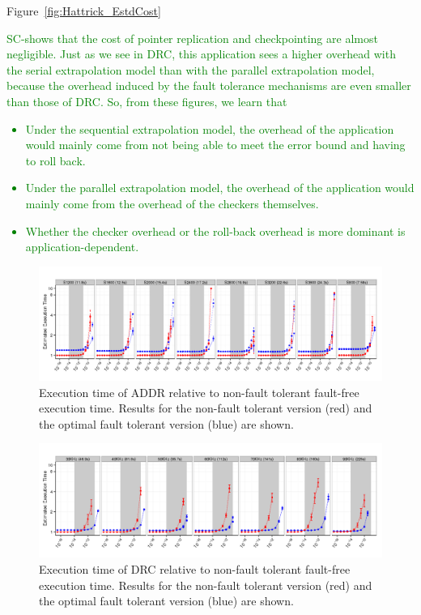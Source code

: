 \documentclass{sig-alternate}
\newcommand{\sui}[1]{%
  \textcolor{green}{SC-#1}
}
\begin{document}
{Figure~\ref{fig:Hattrick_EstdCost}
\sui{shows that the cost of pointer replication and checkpointing are almost negligible. Just as we see in DRC, this application sees a higher overhead with the serial extrapolation model than with the parallel extrapolation model, because the overhead induced by the fault tolerance mechanisms are
even smaller than those of DRC.
So, from these figures, we learn that
\begin{itemize}
\item{Under the sequential extrapolation model, the overhead of the application would mainly come from not being able to meet the error bound and having to roll back.}
\item{Under the parallel extrapolation model, the overhead of the application would mainly come from the overhead of the checkers themselves.}
\item{Whether the checker overhead or the roll-back overhead is more dominant is application-dependent.}
\end{itemize}
}

\begin{figure}[ht!]
\centering
\includegraphics[width=7in]{figs/Lasso_Par_Seq_EstdCost_log.png}
\vspace{-10pt}
\caption{Execution time of ADDR relative to non-fault tolerant fault-free execution time. Results for the non-fault tolerant version (red) and the optimal fault tolerant version (blue) are shown.}
\vspace{-10pt}
\label{fig:Lasso_EstdCost}
\end{figure}

\begin{figure}[ht!]
\centering
\includegraphics[width=7in]{figs/DRC_Par_Seq_EstdCost_log.png}
\vspace{-10pt}
\caption{Execution time of DRC relative to non-fault tolerant fault-free execution time. Results for the non-fault tolerant version (red) and the optimal fault tolerant version (blue) are shown.}
\vspace{-10pt}
\label{fig:DRC_EstdCost}
\end{figure}

}
\end{document}
